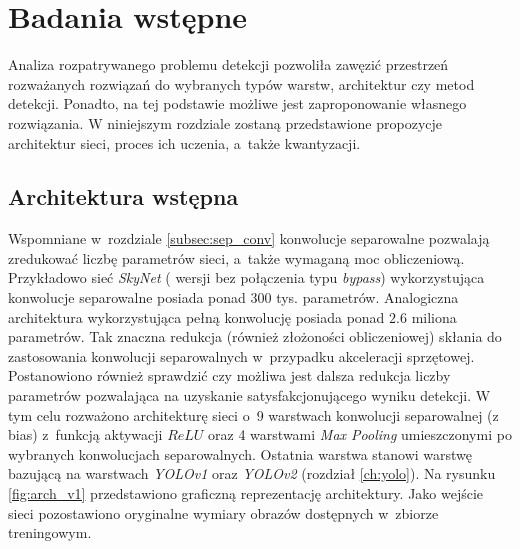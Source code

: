 \chapter{Badania wstępne}
\label{cha:Badania wstępne}

Analiza rozpatrywanego problemu detekcji pozwoliła zawęzić przestrzeń rozważanych rozwiązań do wybranych typów warstw, architektur czy metod detekcji. 
Ponadto, na tej podstawie możliwe jest zaproponowanie własnego rozwiązania.
W niniejszym rozdziale zostaną przedstawione propozycje architektur sieci, proces ich uczenia, a~także kwantyzacji. 

\section{Architektura wstępna}

Wspomniane w~rozdziale \ref{subsec:sep_conv} konwolucje separowalne pozwalają zredukować liczbę parametrów sieci, a~także wymaganą moc obliczeniową.
Przykładowo sieć \emph{SkyNet} ( wersji bez połączenia typu \emph{bypass}) wykorzystująca konwolucje separowalne posiada ponad $300$ tys. parametrów. 
Analogiczna architektura wykorzystująca pełną konwolucję posiada ponad $2.6$ miliona parametrów.
Tak znaczna redukcja (również złożoności obliczeniowej) skłania do zastosowania konwolucji separowalnych w~przypadku akceleracji sprzętowej. 
Postanowiono również sprawdzić czy możliwa jest dalsza redukcja liczby parametrów pozwalająca na uzyskanie satysfakcjonującego wyniku detekcji.  
W tym celu rozważono architekturę sieci o~9 warstwach konwolucji separowalnej (z bias) z~funkcją aktywacji $ReLU$ oraz  4 warstwami \emph{Max Pooling} umieszczonymi po wybranych konwolucjach separowalnych.
Ostatnia warstwa stanowi warstwę bazującą na warstwach \emph{YOLOv1} oraz \emph{YOLOv2} (rozdział \ref{ch:yolo}). 
Na rysunku \ref{fig:arch_v1} przedstawiono graficzną reprezentację architektury. 
Jako wejście sieci pozostawiono oryginalne wymiary obrazów dostępnych w~zbiorze treningowym.

